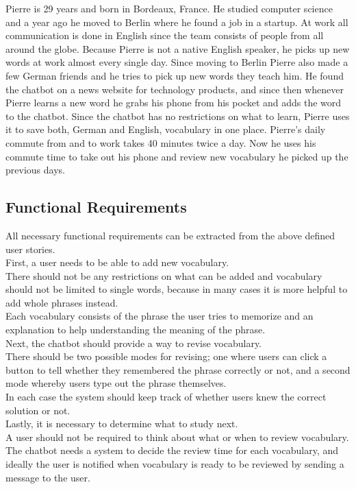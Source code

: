 Pierre is 29 years and born in Bordeaux, France.
He studied computer science and a year ago he moved to Berlin where he found a job in a startup.
At work all communication is done in English since the team consists of people from all around the globe.
Because Pierre is not a native English speaker, he picks up new words at work almost every single day.
Since moving to Berlin Pierre also made a few German friends and he tries to pick up new words they teach him.
He found the chatbot on a news website for technology products,
and since then whenever Pierre learns a new word he grabs his phone from his pocket and adds the word to the chatbot.
Since the chatbot has no restrictions on what to learn, Pierre uses it to save both, German and English, vocabulary in one place.
Pierre's daily commute from and to work takes 40 minutes twice a day.
Now he uses his commute time to take out his phone and review new vocabulary he picked up the previous days.
\\


\subsection{Functional Requirements}
\label{funcreq}

All necessary functional requirements can be extracted from the above defined user stories.
\\

First, a user needs to be able to add new vocabulary.
\\
There should not be any restrictions on what can be added
and vocabulary should not be limited to single words, because in many cases it is more helpful
to add whole phrases instead.
\\
Each vocabulary consists of the phrase the user tries to memorize
and an explanation to help understanding the meaning of the phrase.
\\

Next, the chatbot should provide a way to revise vocabulary.
\\
There should be two possible modes for revising;
one where users can click a button to tell whether they remembered the phrase correctly or not,
and a second mode whereby users type out the phrase themselves.
\\
In each case the system should keep track of whether users knew the correct solution or not.
\\

Lastly, it is necessary to determine what to study next.
\\
A user should not be required to think about what or when to review vocabulary.
The chatbot needs a system to decide the review time for each vocabulary,
and ideally the user is notified when vocabulary is ready to be reviewed by sending a message to the user.
\\

